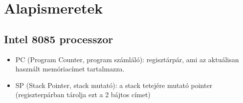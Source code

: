 \section{Alapismeretek}

\subsection{Intel 8085 processzor}

\begin{itemize}
  \item PC (Program Counter, program számláló): regisztárpár, ami az aktuálisan használt memóriacímet tartalmazza.
  \item SP (Stack Pointer, stack mutató): a stack tetejére mutató pointer (regiszterpárban tárolja ezt a 2 bájtos címet)
\end{itemize}
